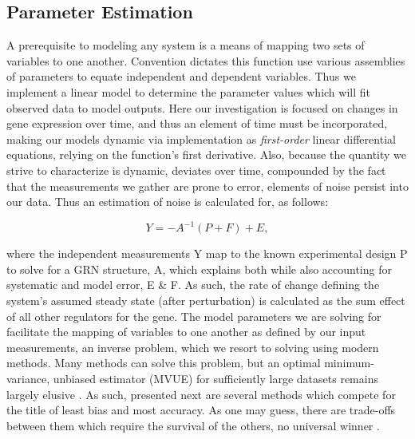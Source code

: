 \subsection{Parameter Estimation}
\label{sec:parest}
A prerequisite to modeling any system is a means of mapping two sets of variables to one another. Convention dictates this function use various assemblies of parameters to equate independent and dependent variables. Thus we implement a linear model to determine the parameter values which will fit observed data to model outputs. Here our investigation is focused on changes in gene expression over time, and thus an element of time must be incorporated, making our models dynamic via implementation as \emph{first-order} linear differential equations, \ie relying on the function's first derivative. Also, because the quantity we strive to characterize is dynamic, \ie deviates over time, compounded by the fact that the measurements we gather are prone to error, elements of noise persist into our data. Thus an estimation of noise is calculated for, as follows:

\begin{equation}
\label{eq:Linearmap}
  Y = -A^{-1}(P+F)+ E,
\end{equation}

where the independent measurements Y map to the known experimental design P to solve for a GRN structure, A, which explains both while also accounting for systematic and model error, E \& F. As such, the rate of change defining the system's assumed steady state (after perturbation) is calculated as the sum effect of all other regulators for the gene. The model parameters we are solving for facilitate the mapping of variables to one another as defined by our input measurements, \ie an inverse problem, which we resort to solving using modern methods. Many methods can solve this problem, but an optimal minimum-variance, unbiased estimator (MVUE) for sufficiently large datasets remains largely elusive \citep{kay1993fundamentals}. As such, presented next are several methods which compete for the title of least bias and most accuracy. As one may guess, there are trade-offs between them which require the survival of the others, \ie no universal winner \citep{marbach2010revealing,narendra2011comprehensive}.



